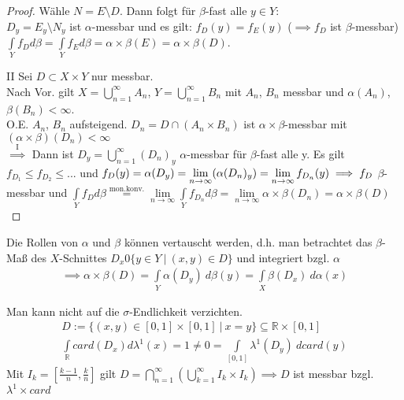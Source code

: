 \begin{proof}
   Wähle $N=E\setminus D$. Dann folgt für $\beta$-fast alle $y\in Y$: \\
   $D_y = E_y \setminus N_y$ ist $\alpha$-messbar und es gilt: $f_D(y) = f_E(y)$ ($\implies f_D$ ist $\beta$-messbar)\\
   $\int\limits_Y f_D d\beta = \int\limits_Y f_E d\beta = \alpha\times\beta(E) = \alpha\times\beta(D)$. 
   \item[II] Sei $D\subset X\times Y$ nur messbar.\\
   Nach Vor. gilt $X=\bigcup\limits_{n=1}^\infty A_n$, $Y=\bigcup\limits_{n=1}^\infty B_n$ mit $A_n$, $B_n$ messbar und $\alpha(A_n)$, $\beta(B_n) < \infty$. \\
   O.E. $A_n$, $B_n$ aufsteigend. $D_n = D\cap (A_n\times B_n)$ ist $\alpha\times\beta$-messbar mit $(\alpha\times\beta)(D_n) < \infty$ \\
   $\overset{\text{I}}{\implies}$ Dann ist $D_y = \bigcup\limits_{n=1}^\infty (D_n)_y$ $\alpha$-messbar für $\beta$-fast alle y. Es gilt $f_{D_1} \leq f_{D_2} \leq ...$ und $f_D(y) = \alpha(D_y) = \lim\limits_{n\to\infty}(\alpha(D_n)_y) = \lim\limits_{n\to\infty}f_{D_n}(y) \\
   \implies f_D$ $\beta$-messbar und $\int\limits_Y f_D d\beta \overset{\text{mon.konv.}}{=} \lim\limits_{n\to\infty}\int\limits_Y f_{D_n}d\beta = \lim\limits_{n\to\infty} \alpha\times\beta(D_n) = \alpha\times\beta(D)$
  \end{proof}

  \begin{remark}
    Die Rollen von $\alpha$ und $\beta$ können vertauscht werden, d.h. man betrachtet das $\beta$-Maß des $X$-Schnittes $D_x 0 \{y \in Y \ | \ (x,y) \in D\}$ und integriert bzgl. $\alpha$
    \begin{align*}
      \implies \alpha \times \beta (D) = \int\limits_Y \alpha(D_y) \ d\beta(y) = \int\limits_X \beta(D_x) \ d\alpha(x)
    \end{align*}
  \end{remark}

  \begin{example}
    Man kann nicht auf die $\sigma$-Endlichkeit verzichten.
    \begin{align*}
      D := \{(x,y) \in [0,1] \times [0,1] \ | \ x=y\} \subseteq \mathbb{R} \times [0,1]\\
      \int\limits_{\mathbb{R}} card(D_x) d\lambda^1(x) = 1 \neq 0 = \int\limits_{[0,1]} \lambda^1(D_y) \ d card(y)
    \end{align*}
    Mit $I_k = [\frac{k-1}{n}, \frac{k}{n}]$ gilt $D = \bigcap\limits_{n=1}^{\infty}( \bigcup\limits_{k=1}^{\infty} I_k \times I_k) \implies D$ ist messbar bzgl. $\lambda^1 \times card$
  \end{example}

